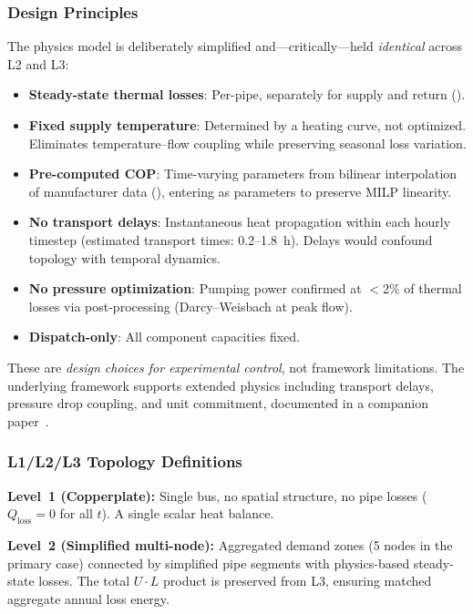 \documentclass[review,3p]{elsarticle}
\begin{document}
\subsubsection{Design Principles}

The physics model is deliberately simplified and---critically---held
\emph{identical} across L2 and L3:
\begin{itemize}[nosep]
    \item \textbf{Steady-state thermal losses}: Per-pipe, separately
    for supply and return ().
    \item \textbf{Fixed supply temperature}: Determined by a heating
    curve, not optimized. Eliminates temperature--flow coupling while
    preserving seasonal loss variation.
    \item \textbf{Pre-computed COP}: Time-varying parameters from
    bilinear interpolation of manufacturer data
    (), entering as parameters to preserve MILP
    linearity.
    \item \textbf{No transport delays}: Instantaneous heat
    propagation within each hourly timestep (estimated transport
    times: 0.2--1.8~h). Delays would confound topology with temporal
    dynamics.
    \item \textbf{No pressure optimization}: Pumping power confirmed
    at $<$2\% of thermal losses via post-processing
    (Darcy--Weisbach at peak flow).
    \item \textbf{Dispatch-only}: All component capacities fixed.
\end{itemize}

These are \emph{design choices for experimental control}, not
framework limitations. The underlying framework supports extended
physics including transport delays, pressure drop coupling, and unit
commitment, documented in a companion paper~\cite{Paper2_CALION}.

\subsubsection{L1/L2/L3 Topology Definitions}
\label{sec:topology_def}

\textbf{Level~1 (Copperplate):} Single bus, no spatial structure, no
pipe losses ($Q_{\mathrm{loss}}=0$ for all $t$). A single scalar heat
balance.

\textbf{Level~2 (Simplified multi-node):} Aggregated demand zones
(5 nodes in the primary case) connected by simplified pipe segments
with physics-based steady-state losses. The total $U \cdot L$ product
is preserved from L3, ensuring matched aggregate annual loss energy.
\end{document}
